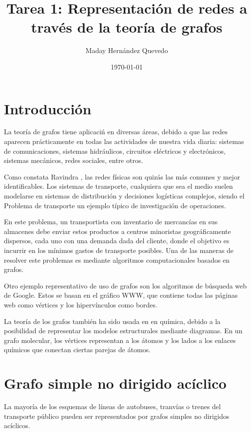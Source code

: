 \documentclass{article}
\title{
Tarea 1: Representación de redes a través de la teoría de grafos
}
\author{Maday Hernández Quevedo}
\date{\today}
\begin{document}
\maketitle

\section*{Introducción}

La teoría de grafos tiene aplicaci\'n en diversas áreas, debido a que las redes aparecen prácticamente en todas las actividades de nuestra vida diaria: sistemas de comunicaciones, sistemas hidráulicos, circuitos eléctricos y electrónicos, sistemas mecánicos, redes sociales, entre otros. 

Como constata Ravindra \cite{ahuja2017network}, las redes físicas son quizás las más comunes y mejor identificables. Los sistemas de transporte, cualquiera que sea el medio suelen modelarse en sistemas de distribución  y decisiones logísticas complejos, siendo el Problema de transporte un ejemplo típico de investigación de operaciones. 

En este problema, un transportista con inventario de mercancías en sus almacenes debe enviar estos productos a centros minoristas geográficamente dispersos, cada uno con una demanda dada del cliente, donde el objetivo es incurrir en los mínimos gastos de transporte posibles. Una de las maneras de resolver este problemas es mediante algoritmos computacionales basados en grafos.

Otro ejemplo representativo de uso de grafos son los algoritmos de búsqueda web de Google. Estos se basan en el gráfico WWW, que contiene todas las páginas web como vértices y los  hipervínculos como bordes. \cite{chung2010graph}

La teoría de los grafos también ha sido usada en en química, debido a la posibilidad de representar los modelos estructurales mediante diagramas. En un grafo molecular, los vértices representan a los átomos y los lados a los enlaces químicos que conectan ciertas parejas de átomos. \cite{amador}

\section{Grafo simple no dirigido acíclico}

La mayoría de los esquemas de líneas de autobuses, tranvías o trenes del transporte público pueden ser representados por grafos simples no dirigidos acíclicos.
\end{document}
